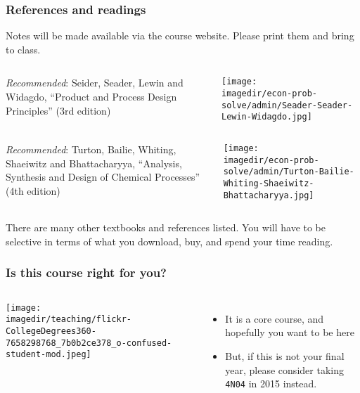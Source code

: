 \begin{frame}\frametitle{References and readings}

	Notes will be made available via the course website. Please print them and bring to class.


	\vspace{12pt}

	\begin{columns}[t]
			\emph{Recommended}: Seider, Seader, Lewin and Widagdo, ``Product and Process Design Principles'' (3rd edition)
			\vspace{-1cm}
			\begin{center}
				\texttt{[image: \\imagedir/econ-prob-solve/admin/Seader-Seader-Lewin-Widagdo.jpg]}
			\end{center}
	\end{columns}

	\vspace{12pt}
	\begin{columns}[t]
			\emph{Recommended}: Turton, Bailie, Whiting, Shaeiwitz and Bhattacharyya, ``Analysis, Synthesis and Design of Chemical Processes'' (4th edition)
			\vspace{-1cm}
			\begin{center}
				\texttt{[image: \\imagedir/econ-prob-solve/admin/Turton-Bailie-Whiting-Shaeiwitz-Bhattacharyya.jpg]}
			\end{center}
	\end{columns}


	\vspace{12pt}
	There are many other textbooks and references listed. You will have to be selective in terms of what you download, buy, and spend your time reading.
\end{frame}

\begin{frame}\frametitle{Is this course right for you?}
	
	\begin{columns}[c]
			\centerline{\texttt{[image: \\imagedir/teaching/flickr-CollegeDegrees360-7658298768\_7b0b2ce378\_o-confused-student-mod.jpeg]}}
			\begin{itemize}
				\item	It is a core course, and hopefully you want to be here
				\item	But, if this is not your final year, please consider taking \texttt{4N04} in 2015 instead.
			\end{itemize}
	\end{columns}
\end{frame}


